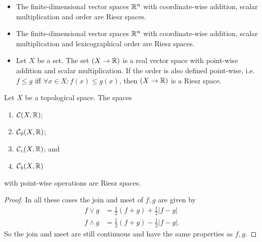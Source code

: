 \begin{example}
\begin{itemize}
\item The finite-dimensional vector spaces $\mathbb{R}^n$ with coordinate-wise addition, scalar multiplication and order are Riesz spaces.
\item The finite-dimensional vector spaces $\mathbb{R}^n$ with coordinate-wise addition, scalar multiplication and lexicographical order are Riesz spaces.
\item Let $X$ be a set. The set $(X\to \mathbb{R})$ is a real vector space with point-wise addition and scalar multiplication. If the order is also defined point-wise, i.e.\ $f \leq g$ iff $\forall x\in X: f(x) \leq g(x)$, then $(X\to \mathbb{R})$ is a Riesz space.
\end{itemize}
\end{example}

\begin{lemma}
Let $X$ be a topological space. The spaces
\begin{enumerate}
\item $\operatorname{\mathcal{C}}(X,\mathbb{R})$;
\item $\operatorname{\mathcal{C}}_0(X,\mathbb{R})$;
\item $\operatorname{\mathcal{C}}_c(X,\mathbb{R})$; and
\item $\operatorname{\mathcal{C}}_b(X,\mathbb{R})$
\end{enumerate}
with point-wise operations are Riesz spaces.
\end{lemma}
\begin{proof}
In all these cases the join and meet of $f,g$ are given by
\begin{align*}
f \vee g &= \frac{1}{2}(f+g)+ \frac{1}{2}|f-g| \\
f \wedge g &= \frac{1}{2}(f+g) - \frac{1}{2}|f-g|.
\end{align*}
So the join and meet are still continuous and have the same properties as $f,g$.
\end{proof}

